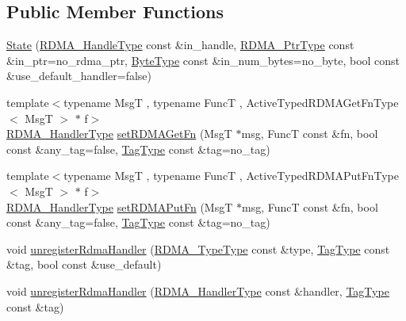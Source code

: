 \subsection*{Public Member Functions}
\begin{DoxyCompactItemize}
\item 
\hyperlink{structvt_1_1rdma_1_1_state_a7ab4e08a915e4b8357e8f079844c9378}{State} (\hyperlink{namespacevt_a10442579ec4e7ebef223818e64bcf908}{R\+D\+M\+A\+\_\+\+Handle\+Type} const \&in\+\_\+handle, \hyperlink{namespacevt_a9e2c953286c7616f7c218e9951790776}{R\+D\+M\+A\+\_\+\+Ptr\+Type} const \&in\+\_\+ptr=no\+\_\+rdma\+\_\+ptr, \hyperlink{namespacevt_aab8d55968084610ce3b17057981e9300}{Byte\+Type} const \&in\+\_\+num\+\_\+bytes=no\+\_\+byte, bool const \&use\+\_\+default\+\_\+handler=false)
\item 
{\footnotesize template$<$typename MsgT , typename FuncT , Active\+Typed\+R\+D\+M\+A\+Get\+Fn\+Type$<$ Msg\+T $>$ $\ast$ f$>$ }\\\hyperlink{namespacevt_a9530efb893c0f3846e8ac5f0507e0f49}{R\+D\+M\+A\+\_\+\+Handler\+Type} \hyperlink{structvt_1_1rdma_1_1_state_ae44026106376eb1542f36c8549f139da}{set\+R\+D\+M\+A\+Get\+Fn} (MsgT $\ast$msg, FuncT const \&fn, bool const \&any\+\_\+tag=false, \hyperlink{namespacevt_a84ab281dae04a52a4b243d6bf62d0e52}{Tag\+Type} const \&tag=no\+\_\+tag)
\item 
{\footnotesize template$<$typename MsgT , typename FuncT , Active\+Typed\+R\+D\+M\+A\+Put\+Fn\+Type$<$ Msg\+T $>$ $\ast$ f$>$ }\\\hyperlink{namespacevt_a9530efb893c0f3846e8ac5f0507e0f49}{R\+D\+M\+A\+\_\+\+Handler\+Type} \hyperlink{structvt_1_1rdma_1_1_state_a08999d62a472684b1f67a4da6d26fcb4}{set\+R\+D\+M\+A\+Put\+Fn} (MsgT $\ast$msg, FuncT const \&fn, bool const \&any\+\_\+tag=false, \hyperlink{namespacevt_a84ab281dae04a52a4b243d6bf62d0e52}{Tag\+Type} const \&tag=no\+\_\+tag)
\item 
void \hyperlink{structvt_1_1rdma_1_1_state_a3c506325f5d0ce4bb46f93f046dd5e3a}{unregister\+Rdma\+Handler} (\hyperlink{namespacevt_1_1rdma_ac848e1d9da43db6294bd06f83e5d3946}{R\+D\+M\+A\+\_\+\+Type\+Type} const \&type, \hyperlink{namespacevt_a84ab281dae04a52a4b243d6bf62d0e52}{Tag\+Type} const \&tag, bool const \&use\+\_\+default)
\item 
void \hyperlink{structvt_1_1rdma_1_1_state_a03702b768cf198e89b9f0323c12d916c}{unregister\+Rdma\+Handler} (\hyperlink{namespacevt_a9530efb893c0f3846e8ac5f0507e0f49}{R\+D\+M\+A\+\_\+\+Handler\+Type} const \&handler, \hyperlink{namespacevt_a84ab281dae04a52a4b243d6bf62d0e52}{Tag\+Type} const \&tag)

\end{DoxyCompactItemize}
